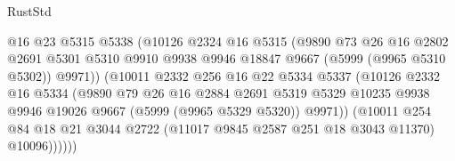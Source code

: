 \begin{lexlean}{RustStd}
\begin{coremodule}
                                  @16
                                  @23
                                  @5315
                                  @5338
                                  (@10126
                                    @2324
                                    @16
                                    @5315
                                    (@9890
                                      @73
                                      @26
                                      @16
                                      @2802
                                      @2691
                                      @5301
                                      @5310
                                      @9910
                                      @9938
                                      @9946
                                      @18847
                                      @9667
                                      (@5999 (@9965 @5310 @5302))
                                      @9971))
                                  (@10011
                                    @2332
                                    @256
                                    @16
                                    @22
                                    @5334
                                    @5337
                                    (@10126
                                      @2332
                                      @16
                                      @5334
                                      (@9890
                                        @79
                                        @26
                                        @16
                                        @2884
                                        @2691
                                        @5319
                                        @5329
                                        @10235
                                        @9938
                                        @9946
                                        @19026
                                        @9667
                                        (@5999 (@9965 @5329 @5320))
                                        @9971))
                                    (@10011
                                      @254
                                      @84
                                      @18
                                      @21
                                      @3044
                                      @2722
                                      (@11017 @9845 @2587 @251 @18 @3043 @11370)
                                      @10096))))))

\end{coremodule}
\end{lexlean}
